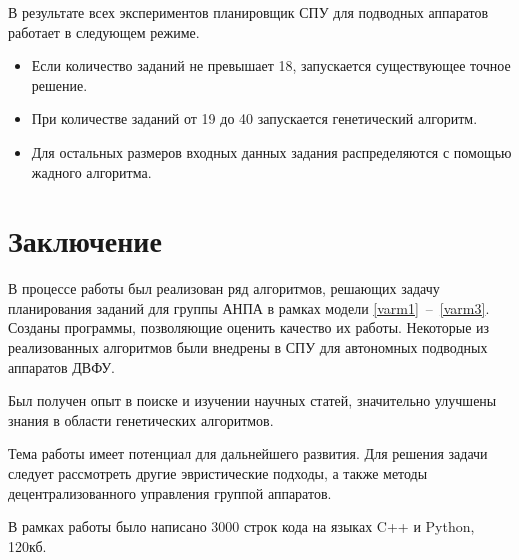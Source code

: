 \documentclass[a4paper,14pt,russian]{article}
\begin{document}
В результате всех экспериментов планировщик СПУ для подводных аппаратов работает в следующем режиме.
\begin{itemize}
\item Если количество заданий не превышает 18, запускается существующее точное решение.
\item При количестве заданий от 19 до 40 запускается генетический алгоритм.
\item Для остальных размеров входных данных задания распределяются с помощью жадного алгоритма.
\end{itemize}

\section{Заключение}
В процессе работы был реализован ряд алгоритмов, решающих задачу планирования заданий для группы АНПА в рамках модели \eqref{varm1}~--~\eqref{varm3}. Созданы программы, позволяющие оценить качество их работы. Некоторые из реализованных алгоритмов были внедрены в СПУ для автономных подводных аппаратов ДВФУ.

Был получен опыт в поиске и изучении научных статей, значительно улучшены знания в области генетических алгоритмов.

Тема работы имеет потенциал для дальнейшего развития. Для решения задачи следует рассмотреть другие эвристические подходы, а также методы децентрализованного управления группой аппаратов.

В рамках работы было написано 3000 строк кода на языках C++ и Python, 120кб.


\pagebreak



\end{document}
